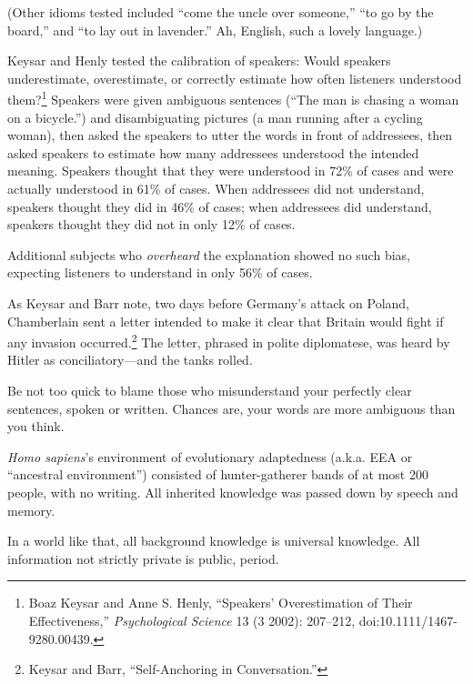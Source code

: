 {
 (Other idioms tested included ``come the uncle
over someone,'' ``to go by the
board,'' and ``to lay out in
lavender.'' Ah, English, such a lovely language.)}

{
 Keysar and Henly tested the calibration of speakers: Would
speakers underestimate, overestimate, or correctly estimate how often
listeners understood them?\footnote{Boaz Keysar and Anne S. Henly,
``Speakers' Overestimation of Their
Effectiveness,'' \textit{Psychological Science} 13 (3
2002): 207--212, doi:10.1111/1467-9280.00439.} Speakers were given
ambiguous sentences (``The man is chasing a woman on a
bicycle.'') and disambiguating pictures (a man
running after a cycling woman), then asked the speakers to utter the
words in front of addressees, then asked speakers to estimate how many
addressees understood the intended meaning. Speakers thought that they
were understood in 72\% of cases and were actually understood in 61\%
of cases. When addressees did not understand, speakers thought they did
in 46\% of cases; when addressees did understand, speakers thought they
did not in only 12\% of cases.}

{
 Additional subjects who \textit{overheard} the explanation showed
no such bias, expecting listeners to understand in only 56\% of cases.}

{
 As Keysar and Barr note, two days before Germany's
attack on Poland, Chamberlain sent a letter intended to make it clear
that Britain would fight if any invasion occurred.\footnote{Keysar and Barr, ``Self-Anchoring in
Conversation.''}
The letter, phrased in polite diplomatese, was heard by Hitler as
conciliatory---and the tanks rolled.}

{
 Be not too quick to blame those who misunderstand your perfectly
clear sentences, spoken or written. Chances are, your words are more
ambiguous than you think.}

\myendsectiontext


\bigskip


{
 \textit{Homo sapiens}'s environment of
evolutionary adaptedness (a.k.a. EEA or ``ancestral
environment'') consisted of hunter-gatherer bands of
at most 200 people, with no writing. All inherited knowledge was passed
down by speech and memory. }

{
 In a world like that, all background knowledge is universal
knowledge. All information not strictly private is public, period.}

